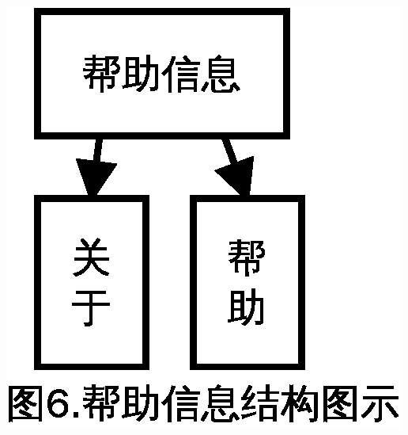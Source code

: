 \documentclass[10pt,a4paper]{article}
\begin{document}
\newline
\newline
\includegraphics[scale=0.7]{4}
\end{document}
